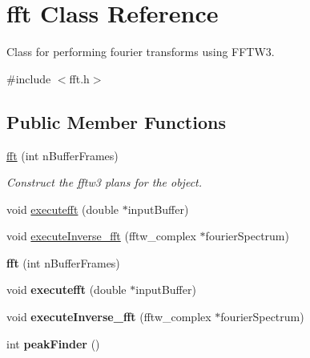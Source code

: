 \hypertarget{classfft}{\section{fft Class Reference}
\label{classfft}
}


Class for performing fourier transforms using F\-F\-T\-W3.  




{\ttfamily \#include $<$fft.\-h$>$}

\subsection*{Public Member Functions}
\begin{DoxyCompactItemize}
\item 
\hypertarget{classfft_a5fff94ac07119207ddd05f628be5891d}{\hyperlink{classfft_a5fff94ac07119207ddd05f628be5891d}{fft} (int n\-Buffer\-Frames)}\label{classfft_a5fff94ac07119207ddd05f628be5891d}

\begin{DoxyCompactList}\small\item\em Construct the fftw3 plans for the object. \end{DoxyCompactList}\item 
void \hyperlink{classfft_a47e58fd4f715ad89a6fad8df9d715bf4}{executefft} (double $\ast$input\-Buffer)
\item 
void \hyperlink{classfft_a228bd861564c189cd7b6800c950a1c09}{execute\-Inverse\-\_\-fft} (fftw\-\_\-complex $\ast$fourier\-Spectrum)
\item 
\hypertarget{classfft_a5fff94ac07119207ddd05f628be5891d}{{\bfseries fft} (int n\-Buffer\-Frames)}\label{classfft_a5fff94ac07119207ddd05f628be5891d}

\item 
\hypertarget{classfft_a47e58fd4f715ad89a6fad8df9d715bf4}{void {\bfseries executefft} (double $\ast$input\-Buffer)}\label{classfft_a47e58fd4f715ad89a6fad8df9d715bf4}

\item 
\hypertarget{classfft_a228bd861564c189cd7b6800c950a1c09}{void {\bfseries execute\-Inverse\-\_\-fft} (fftw\-\_\-complex $\ast$fourier\-Spectrum)}\label{classfft_a228bd861564c189cd7b6800c950a1c09}

\item 
\hypertarget{classfft_acd506cabf787a130ba123c29224f5488}{int {\bfseries peak\-Finder} ()}\label{classfft_acd506cabf787a130ba123c29224f5488}


\end{DoxyCompactItemize}
